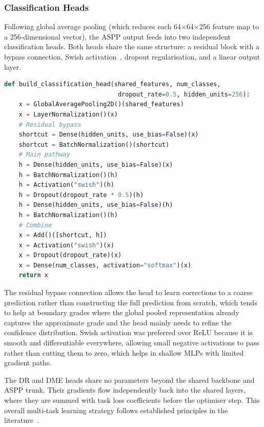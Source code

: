 \documentclass[12pt,a4paper]{article}
\begin{document}
\subsubsection{Classification Heads}

Following global average pooling (which reduces each 64$\times$64$\times$256 feature map to a 256-dimensional vector), the ASPP output feeds into two independent classification heads. Both heads share the same structure: a residual block with a bypass connection, Swish activation~\cite{Ramachandran2017}, dropout regularisation, and a linear output layer.
\newpage

\begin{lstlisting}[language=python, caption={Classification head structure, illustrated for the DR head.}]
def build_classification_head(shared_features, num_classes, 
                               dropout_rate=0.5, hidden_units=256):
    x = GlobalAveragePooling2D()(shared_features)
    x = LayerNormalization()(x)
    # Residual bypass
    shortcut = Dense(hidden_units, use_bias=False)(x)
    shortcut = BatchNormalization()(shortcut)
    # Main pathway
    h = Dense(hidden_units, use_bias=False)(x)
    h = BatchNormalization()(h)
    h = Activation("swish")(h)
    h = Dropout(dropout_rate * 0.5)(h)
    h = Dense(hidden_units, use_bias=False)(h)
    h = BatchNormalization()(h)
    # Combine
    x = Add()([shortcut, h])
    x = Activation("swish")(x)
    x = Dropout(dropout_rate)(x)
    x = Dense(num_classes, activation="softmax")(x)
    return x
\end{lstlisting}

The residual bypass connection allows the head to learn corrections to a coarse prediction rather than constructing the full prediction from scratch, which tends to help at boundary grades where the global pooled representation already captures the approximate grade and the head mainly needs to refine the confidence distribution. Swish activation was preferred over ReLU because it is smooth and differentiable everywhere, allowing small negative activations to pass rather than cutting them to zero, which helps in shallow MLPs with limited gradient paths.

The DR and DME heads share no parameters beyond the shared backbone and ASPP trunk. Their gradients flow independently back into the shared layers, where they are summed with task loss coefficients before the optimiser step. This overall multi-task learning strategy follows established principles in the literature~\cite{Ruder2017}.
\end{document}
